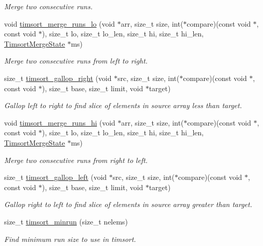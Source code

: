 \begin{DoxyCompactItemize}
\begin{DoxyCompactList}\small\item\em Merge two consecutive runs. \end{DoxyCompactList}\item 
void \hyperlink{group__Timsort_ga9ed838122eff00630e9551003d73a56f}{timsort\+\_\+merge\+\_\+runs\+\_\+lo} (void $\ast$arr, size\+\_\+t size, int($\ast$compare)(const void $\ast$, const void $\ast$), size\+\_\+t lo, size\+\_\+t lo\+\_\+len, size\+\_\+t hi, size\+\_\+t hi\+\_\+len, \hyperlink{structTimsortMergeState}{Timsort\+Merge\+State} $\ast$ms)
\begin{DoxyCompactList}\small\item\em Merge two consecutive runs from left to right. \end{DoxyCompactList}\item 
size\+\_\+t \hyperlink{group__Timsort_gaf272b7c7b32279bc6aa2010330e7d980}{timsort\+\_\+gallop\+\_\+right} (void $\ast$src, size\+\_\+t size, int($\ast$compare)(const void $\ast$, const void $\ast$), size\+\_\+t base, size\+\_\+t limit, void $\ast$target)
\begin{DoxyCompactList}\small\item\em Gallop left to right to find slice of elements in source array less than target. \end{DoxyCompactList}\item 
void \hyperlink{group__Timsort_ga5f8c1d718a58791f523430113eb5616e}{timsort\+\_\+merge\+\_\+runs\+\_\+hi} (void $\ast$arr, size\+\_\+t size, int($\ast$compare)(const void $\ast$, const void $\ast$), size\+\_\+t lo, size\+\_\+t lo\+\_\+len, size\+\_\+t hi, size\+\_\+t hi\+\_\+len, \hyperlink{structTimsortMergeState}{Timsort\+Merge\+State} $\ast$ms)
\begin{DoxyCompactList}\small\item\em Merge two consecutive runs from right to left. \end{DoxyCompactList}\item 
size\+\_\+t \hyperlink{group__Timsort_ga61e102d0fe24f871260f90f9e40ba807}{timsort\+\_\+gallop\+\_\+left} (void $\ast$src, size\+\_\+t size, int($\ast$compare)(const void $\ast$, const void $\ast$), size\+\_\+t base, size\+\_\+t limit, void $\ast$target)
\begin{DoxyCompactList}\small\item\em Gallop right to left to find slice of elements in source array greater than target. \end{DoxyCompactList}\item 
size\+\_\+t \hyperlink{group__Timsort_ga7d1b40d5d91736aa4b5362896cdc68f3}{timsort\+\_\+minrun} (size\+\_\+t nelems)
\begin{DoxyCompactList}\small\item\em Find minimum run size to use in timsort. \end{DoxyCompactList}\end{DoxyCompactItemize}


